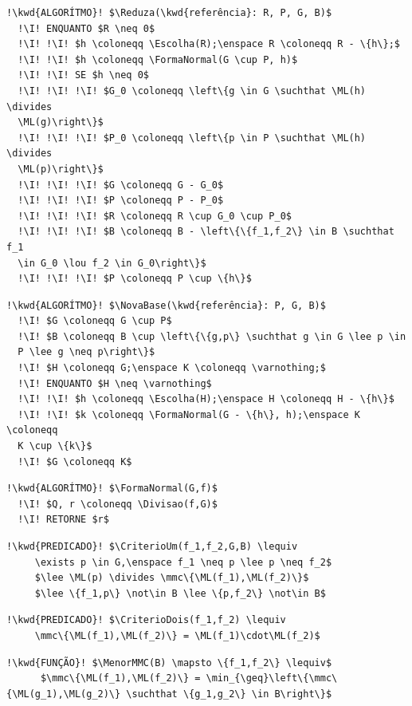 \documentclass[12pt,a4paper]{report}
\newcommand{\kwd}[1]{\texttt{\textcolor{keyword}{#1}}}
\newcommand{\I}{\enspace\textcolor{indent}\vrule\hspace{2pt}}
\newcommand{\lee}{\enspace\land\enspace}
\newcommand{\lou}{\enspace\lor\enspace}
\newcommand{\lequiv}{\enspace\Longleftrightarrow\enspace}
\newcommand{\suchthat}{\enspace\middle|\enspace}
\newcommand{\divides}{\parallel}
\numberwithin{theorem}{chapter}
\DeclareMathOperator{\ML}{ML}
\DeclareMathOperator{\mmc}{mmc}
\DeclareMathOperator{\Reduza}{Reduza}
\DeclareMathOperator{\NovaBase}{NovaBase}
\DeclareMathOperator{\MenorMMC}{MenorMMC}
\DeclareMathOperator{\CriterioUm}{Crit\acute{e}rio1}
\DeclareMathOperator{\CriterioDois}{Crit\acute{e}rio2}
\DeclareMathOperator{\FormaNormal}{FormaNormal}
\DeclareMathOperator{\Escolha}{Escolha}
\DeclareMathOperator{\Divisao}{Divis\tilde{a}o}
\begin{document}
\begin{lstlisting}[language=algorithm]
  !\kwd{ALGORÍTMO}! $\Reduza(\kwd{referência}: R, P, G, B)$
  !\I! ENQUANTO $R \neq 0$
  !\I! !\I! $h \coloneqq \Escolha(R);\enspace R \coloneqq R - \{h\};$
  !\I! !\I! $h \coloneqq \FormaNormal(G \cup P, h)$
  !\I! !\I! SE $h \neq 0$
  !\I! !\I! !\I! $G_0 \coloneqq \left\{g \in G \suchthat \ML(h) \divides
  \ML(g)\right\}$
  !\I! !\I! !\I! $P_0 \coloneqq \left\{p \in P \suchthat \ML(h) \divides
  \ML(p)\right\}$
  !\I! !\I! !\I! $G \coloneqq G - G_0$
  !\I! !\I! !\I! $P \coloneqq P - P_0$
  !\I! !\I! !\I! $R \coloneqq R \cup G_0 \cup P_0$
  !\I! !\I! !\I! $B \coloneqq B - \left\{\{f_1,f_2\} \in B \suchthat f_1
  \in G_0 \lou f_2 \in G_0\right\}$
  !\I! !\I! !\I! $P \coloneqq P \cup \{h\}$
\end{lstlisting}

\begin{lstlisting}[language=algorithm]
  !\kwd{ALGORÍTMO}! $\NovaBase(\kwd{referência}: P, G, B)$
  !\I! $G \coloneqq G \cup P$
  !\I! $B \coloneqq B \cup \left\{\{g,p\} \suchthat g \in G \lee p \in
  P \lee g \neq p\right\}$
  !\I! $H \coloneqq G;\enspace K \coloneqq \varnothing;$
  !\I! ENQUANTO $H \neq \varnothing$
  !\I! !\I! $h \coloneqq \Escolha(H);\enspace H \coloneqq H - \{h\}$
  !\I! !\I! $k \coloneqq \FormaNormal(G - \{h\}, h);\enspace K \coloneqq
  K \cup \{k\}$
  !\I! $G \coloneqq K$
\end{lstlisting}

\begin{lstlisting}[language=algorithm]
  !\kwd{ALGORÍTMO}! $\FormaNormal(G,f)$
  !\I! $Q, r \coloneqq \Divisao(f,G)$
  !\I! RETORNE $r$
\end{lstlisting}

\begin{lstlisting}[language=algorithm]
  !\kwd{PREDICADO}! $\CriterioUm(f_1,f_2,G,B) \lequiv
     \exists p \in G,\enspace f_1 \neq p \lee p \neq f_2$
     $\lee \ML(p) \divides \mmc\{\ML(f_1),\ML(f_2)\}$
     $\lee \{f_1,p\} \not\in B \lee \{p,f_2\} \not\in B$
\end{lstlisting}

\begin{lstlisting}[language=algorithm]
  !\kwd{PREDICADO}! $\CriterioDois(f_1,f_2) \lequiv
     \mmc\{\ML(f_1),\ML(f_2)\} = \ML(f_1)\cdot\ML(f_2)$
\end{lstlisting}

\begin{lstlisting}[language=algorithm]
  !\kwd{FUNÇÃO}! $\MenorMMC(B) \mapsto \{f_1,f_2\} \lequiv$
      $\mmc\{\ML(f_1),\ML(f_2)\} = \min_{\geq}\left\{\mmc\{\ML(g_1),\ML(g_2)\} \suchthat \{g_1,g_2\} \in B\right\}$
\end{lstlisting}
\end{document}
